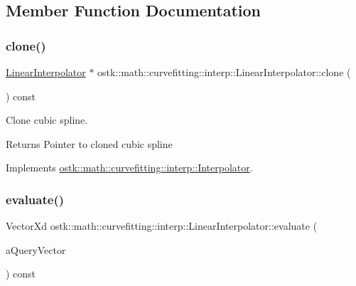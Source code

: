 \subsection{Member Function Documentation}
\mbox{\label{classostk_1_1math_1_1curvefitting_1_1interp_1_1_linear_interpolator_aaf48bb953f88279ff2cb755da611e937}} 
\subsubsection{\texorpdfstring{clone()}{clone()}}
{\footnotesize\ttfamily \hyperlink{classostk_1_1math_1_1curvefitting_1_1interp_1_1_linear_interpolator}{Linear\+Interpolator} $\ast$ ostk\+::math\+::curvefitting\+::interp\+::\+Linear\+Interpolator\+::clone (\begin{DoxyParamCaption}{ }\end{DoxyParamCaption}) const\hspace{0.3cm}{\ttfamily [virtual]}}



Clone cubic spline. 

\begin{DoxyReturn}{Returns}
Pointer to cloned cubic spline 
\end{DoxyReturn}


Implements \hyperlink{classostk_1_1math_1_1curvefitting_1_1interp_1_1_interpolator_a717dc5547d117cccd73506b75c40c66a}{ostk\+::math\+::curvefitting\+::interp\+::\+Interpolator}.

\mbox{\label{classostk_1_1math_1_1curvefitting_1_1interp_1_1_linear_interpolator_abf0d1f4f1bf3dc1a64cfb1183c8e3e83}} 
\subsubsection{\texorpdfstring{evaluate()}{evaluate()}\hspace{0.1cm}{\footnotesize\ttfamily [1/2]}}
{\footnotesize\ttfamily Vector\+Xd ostk\+::math\+::curvefitting\+::interp\+::\+Linear\+Interpolator\+::evaluate (\begin{DoxyParamCaption}\item[{const Vector\+Xd \&}]{a\+Query\+Vector }\end{DoxyParamCaption}) const\hspace{0.3cm}{\ttfamily [virtual]}}



